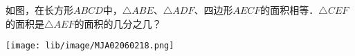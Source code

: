 如图，在长方形$ABCD$中，$\triangle ABE$、$\triangle ADF$、四边形$AECF$的面积相等．$\triangle CEF$的面积是$\triangle AEF$的面积的几分之几？
\begin{flushright}
\texttt{[image: lib/image/MJA02060218.png]}
\end{flushright}
